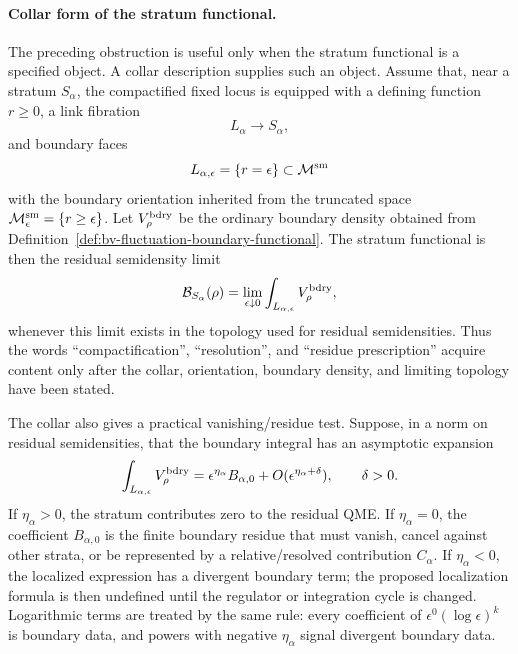 \paragraph{Collar form of the stratum functional.}
The preceding obstruction is useful only when the stratum functional is a
specified object.  A collar description supplies such an object.  Assume that,
near a stratum \(S_\alpha\), the compactified fixed locus is equipped with a
defining function \(r\geq0\), a link fibration
\[
  L_\alpha\longrightarrow S_\alpha,
\]
and boundary faces
\[
  L_{\alpha,\epsilon}=\{r=\epsilon\}\subset \mathcal M^{\rm sm}
\]
with the boundary orientation inherited from the truncated space
\(\mathcal M^{\rm sm}_\epsilon=\{r\geq\epsilon\}\).  Let
\(V_\rho^{\rm bdry}\) be the ordinary boundary density obtained from
Definition~\ref{def:bv-fluctuation-boundary-functional}.  The stratum
functional is then the residual semidensity limit
\begin{equation}
  \mathcal B_{S_\alpha}(\rho)
  =
  \lim_{\epsilon\downarrow0}
  \int_{L_{\alpha,\epsilon}} V_\rho^{\rm bdry},
  \label{eq:stratum-boundary-functional-collar-limit}
\end{equation}
whenever this limit exists in the topology used for residual semidensities.
Thus the words ``compactification'', ``resolution'', and ``residue
prescription'' acquire content only after the collar, orientation, boundary
density, and limiting topology have been stated.

The collar also gives a practical vanishing/residue test.  Suppose, in a norm
on residual semidensities, that the boundary integral has an asymptotic
expansion
\begin{equation}
  \int_{L_{\alpha,\epsilon}} V_\rho^{\rm bdry}
  =
  \epsilon^{\eta_\alpha}B_{\alpha,0}
  +
  O(\epsilon^{\eta_\alpha+\delta}),
  \qquad
  \delta>0 .
  \label{eq:stratum-boundary-asymptotic}
\end{equation}
If \(\eta_\alpha>0\), the stratum contributes zero to the residual QME.  If
\(\eta_\alpha=0\), the coefficient \(B_{\alpha,0}\) is the finite boundary
residue that must vanish, cancel against other strata, or be represented by a
relative/resolved contribution \(C_\alpha\).  If \(\eta_\alpha<0\), the
localized expression has a divergent boundary term; the proposed localization
formula is then undefined until the regulator or integration cycle is changed.
Logarithmic terms are treated by the same rule: every coefficient of
\(\epsilon^0(\log\epsilon)^k\) is boundary data, and powers with negative
\(\eta_\alpha\) signal divergent boundary data.

